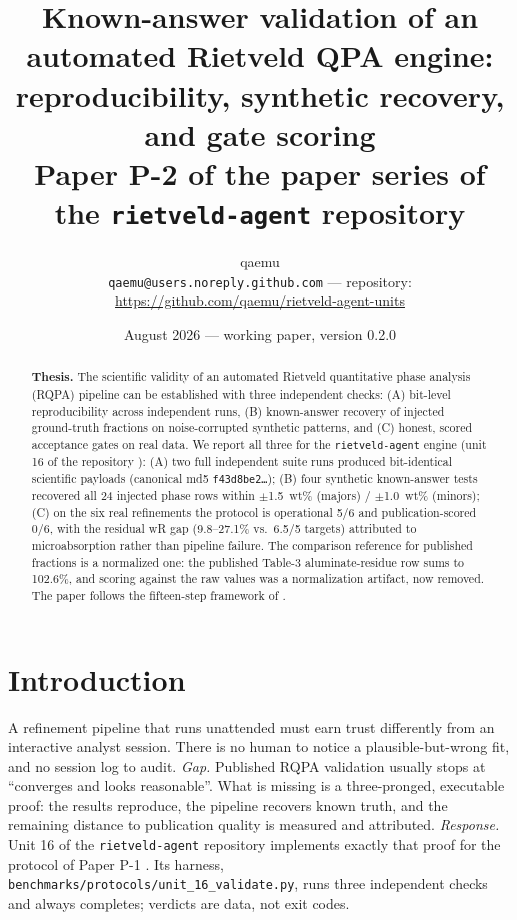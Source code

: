 \documentclass[11pt,a4paper]{article}
\title{\textbf{Known-answer validation of an automated Rietveld QPA
engine: reproducibility, synthetic recovery, and gate scoring}\\
\large Paper P-2 of the paper series of the
\texttt{rietveld-agent} repository}
\author{qaemu\\
\small \texttt{qaemu@users.noreply.github.com} --- repository:
\url{https://github.com/qaemu/rietveld-agent-units}}
\date{August 2026 --- working paper, version 0.2.0}
\begin{document}
\maketitle

\begin{abstract}
\noindent \textbf{Thesis.} The scientific validity of an automated
Rietveld quantitative phase analysis (RQPA) pipeline can be established
with three independent checks: (A) bit-level reproducibility across
independent runs, (B) known-answer recovery of injected ground-truth
fractions on noise-corrupted synthetic patterns, and (C) honest, scored
acceptance gates on real data. We report all three for the
\texttt{rietveld-agent} engine (unit 16 of the repository
\cite{rietveld-agent}): (A) two full independent suite runs produced
bit-identical scientific payloads (canonical md5
\texttt{f43d8be2}\allowbreak\texttt{\ldots}); (B) four synthetic known-answer tests recovered
all 24 injected phase rows within $\pm$1.5~wt\% (majors) /
$\pm$1.0~wt\% (minors); (C) on the six real refinements the protocol is
operational 5/6 and publication-scored 0/6, with the residual wR gap
(9.8--27.1\% vs.\ 6.5/5 targets) attributed to microabsorption rather
than pipeline failure. The comparison reference for published fractions
is a normalized one: the published Table-3 aluminate-residue row sums to
102.6\%, and scoring against the raw values was a normalization artifact,
now removed. The paper follows the fifteen-step framework of
\cite{drake2025fifteen}.
\end{abstract}

\section{Introduction}
A refinement pipeline that runs unattended must earn trust differently
from an interactive analyst session. There is no human to notice a
plausible-but-wrong fit, and no session log to audit. \emph{Gap.}
Published RQPA validation usually stops at ``converges and looks
reasonable''. What is missing is a three-pronged, executable proof:
the results reproduce, the pipeline recovers known truth, and the
remaining distance to publication quality is measured and attributed.
\emph{Response.} Unit 16 of the \texttt{rietveld-agent} repository
\cite{rietveld-agent} implements exactly that proof for the protocol of
Paper P-1 \cite{rietveld-agent}. Its harness,
\texttt{benchmarks/protocols/unit\_16\_validate.py}, runs three independent
checks and always completes; verdicts are data, not exit codes.
\end{document}
